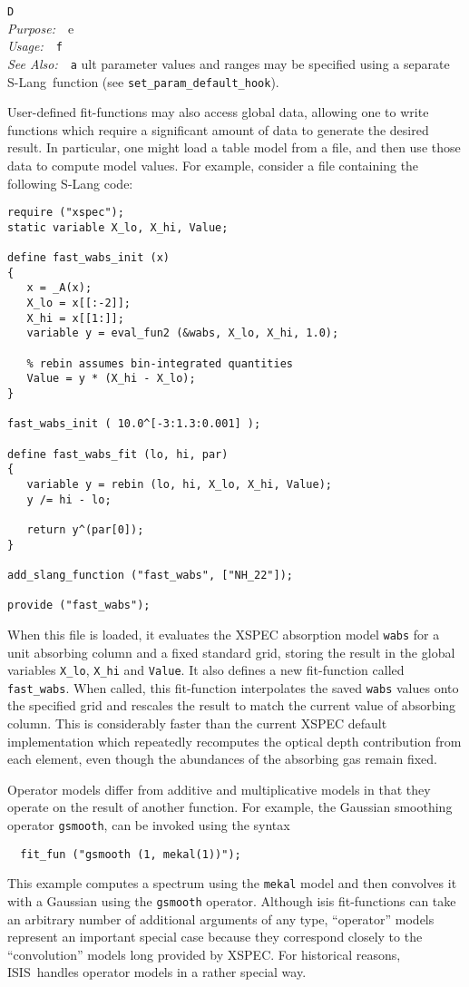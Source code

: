 \documentclass{book}
\makeatletter
\newif\ifpdf
\newcommand{\isis}{{\sc ISIS}}
\newcommand{\slang}{{\sc S-Lang}}
\newenvironment{isisfunction}[4]%
{\index{{#1}@{\tt #1}}%
  \ifpdf
  \else
     \addcontentsline{toc}{subsection}{{#1} -- {#2}}
  \fi
  \vbox{
          \vspace*{\baselineskip}
          {\LARGE\tt #1}\vspace*{\baselineskip}\\
          {{\it Purpose:}~~{#2}}\\
          {{\it Usage:}~~{\tt #3}}\\
          {{\it See Also:}~~{\tt #4}}
       }
}%
{ }
\makeatother
\begin{document}
{\begin{isisfunction}
Default parameter values and ranges may be specified using a
separate \slang\ function (see \verb|set_param_default_hook|).

User-defined fit-functions may also access global data, allowing
one to write functions which require a significant amount of data
to generate the desired result.  In particular, one might load a
table model from a file, and then use those data to compute model
values. For example, consider a file containing the following
S-Lang code:

\begin{verbatim}
require ("xspec");
static variable X_lo, X_hi, Value;

define fast_wabs_init (x)
{
   x = _A(x);
   X_lo = x[[:-2]];
   X_hi = x[[1:]];
   variable y = eval_fun2 (&wabs, X_lo, X_hi, 1.0);

   % rebin assumes bin-integrated quantities
   Value = y * (X_hi - X_lo);
}

fast_wabs_init ( 10.0^[-3:1.3:0.001] );

define fast_wabs_fit (lo, hi, par)
{
   variable y = rebin (lo, hi, X_lo, X_hi, Value);
   y /= hi - lo;

   return y^(par[0]);
}

add_slang_function ("fast_wabs", ["NH_22"]);

provide ("fast_wabs");
\end{verbatim}

When this file is loaded, it evaluates the XSPEC absorption model
\verb|wabs| for a unit absorbing column and a fixed standard grid,
storing the result in the global variables \verb|X_lo|,
\verb|X_hi| and \verb|Value|.  It also defines a new fit-function
called \verb|fast_wabs|.  When called, this fit-function
interpolates the saved \verb|wabs| values onto the specified grid
and rescales the result to match the current value of absorbing
column. This is considerably faster than the current XSPEC default
implementation which repeatedly recomputes the optical depth
contribution from each element, even though the abundances of the
absorbing gas remain fixed.

Operator models differ from additive and multiplicative models
in that they operate on the result of another function. For
example, the Gaussian smoothing operator \verb|gsmooth|, can be
invoked using the syntax
\begin{verbatim}
  fit_fun ("gsmooth (1, mekal(1))");
\end{verbatim}
This example computes a spectrum using the \verb|mekal| model
and then convolves it with a Gaussian using the \verb|gsmooth|
operator. Although isis fit-functions can take an arbitrary
number of additional arguments of any type, ``operator'' models
represent an important special case because they correspond
closely to the ``convolution'' models long provided by XSPEC.
For historical reasons, \isis\ handles operator models in a
rather special way.


\end{isisfunction}}
\end{document}
